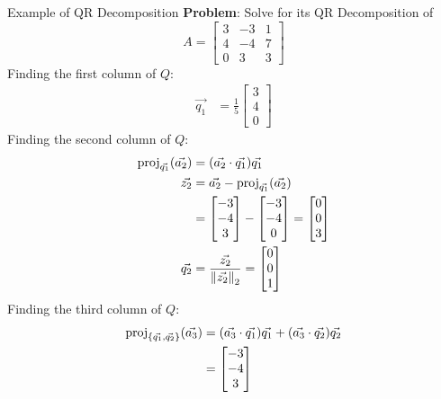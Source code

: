 \begin{ln-explain}{Example of QR Decomposition}{}
    \textbf{Problem}: 
    Solve for its QR Decomposition of
    \[
        A = 
        \begin{bmatrix}
            3 & -3 & 1 \\
            4 & -4 & 7 \\
            0 & 3 & 3
        \end{bmatrix}
    \]
    \tcblower
    Finding the first column of $Q$:
    \begin{align*}
        \vec{q_1} &= \frac{1}{5} \begin{bmatrix} 3 \\ 4 \\ 0 \end{bmatrix}
    \end{align*}
    Finding the second column of $Q$:
    \begin{align*}
        \text{proj}_{\vec{q_1}}(\vec{a_2})
        &= (\vec{a_2} \cdot \vec{q_1}) \vec{q_1} \\
        \vec{z_2} &= \vec{a_2} - \text{proj}_{\vec{q_1}}(\vec{a_2}) \\
        &= \begin{bmatrix} -3 \\ -4 \\ 3 \end{bmatrix} - \begin{bmatrix} -3 \\ -4 \\ 0 \end{bmatrix} = \begin{bmatrix} 0 \\ 0 \\ 3 \end{bmatrix} \\
        \vec{q_2} &= \frac{\vec{z_2}}{{\| \vec{z_2} \|}_{2}^{}} = \begin{bmatrix} 0 \\ 0 \\ 1 \end{bmatrix}
    \end{align*}
    Finding the third column of $Q$:
    \begin{align*}
        \proj{\{\vec{q_1}, \vec{q_2}\}}{\vec{a_3}}
        &= (\vec{a_3} \cdot \vec{q_1}) \vec{q_1} + (\vec{a_3} \cdot \vec{q_2}) \vec{q_2} \\
        &= \begin{bmatrix} -3 \\ -4 \\ 3 \end{bmatrix} \\

\end{align*}
\end{ln-explain}
